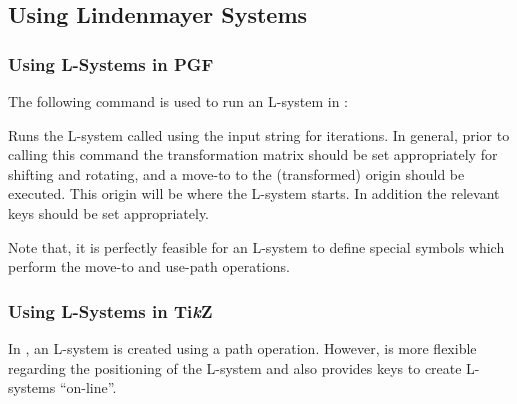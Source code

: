\subsection{Using Lindenmayer Systems}
\subsubsection{Using L-Systems in PGF}

The following command is used to run an L-system in \pgfname:
\begin{command}{\pgflindenmayersystem{}}
  Runs the L-system called  using the input string 
  for  iterations.
  In general, prior to calling this command the 
  transformation matrix should be set appropriately for shifting and
  rotating, and a move-to to the (transformed) origin should be 
  executed. This origin will be where the L-system starts.
  In addition the relevant keys should be set appropriately.
  
\begin{codeexample}[]
\end{codeexample}

  Note that, it is perfectly feasible for an L-system to define
  special symbols which perform the move-to and use-path 
  operations.
  
\end{command}

\subsubsection{Using L-Systems in Ti\emph{k}Z}

  In \tikzname, an L-system is created using a path operation. 
  However, \tikzname{} is more flexible regarding the positioning
  of the L-system and also provides keys to create L-systems
  ``on-line''.
  
